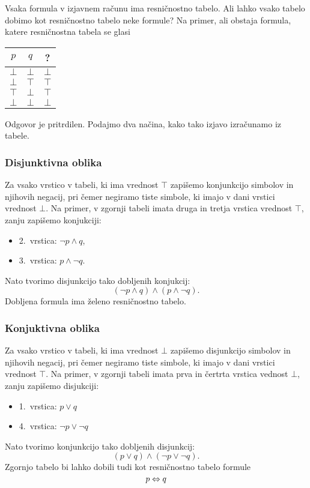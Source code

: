 Vsaka formula v izjavnem računu ima resničnostno tabelo. Ali lahko vsako tabelo
dobimo kot resničnostno tabelo neke formule? Na primer, ali obstaja formula,
katere resničnostna tabela se glasi
%
\begin{center}
  \begin{tabular}{ccc}
    \toprule
    $p$ & $q$ & ? \\ \midrule
    $\bot$ & $\bot$ & $\bot$ \\
    $\bot$ & $\top$ & $\top$ \\
    $\top$ & $\bot$ & $\top$ \\
    $\bot$ & $\bot$ & $\bot$ \\
    \bottomrule
  \end{tabular}
\end{center}
%
Odgovor je pritrdilen. Podajmo dva načina, kako tako izjavo izračunamo iz tabele.

\subsubsection{Disjunktivna oblika}
\label{sec:disjunktivna-oblika}

Za vsako vrstico v tabeli, ki ima vrednost $\top$ zapišemo konjunkcijo simbolov in
njihovih negacij, pri čemer negiramo tiste simbole, ki imajo v dani vrstici vrednost
$\bot$. Na primer, v zgornji tabeli imata druga in tretja vrstica vrednost $\top$, zanju
zapišemo konjukciji:
%
\begin{itemize}
\item 2.~vrstica: $\neg p \land q$,
\item 3.~vrstica: $p \land \neg q$.
\end{itemize}
%
Nato tvorimo disjunkcijo tako dobljenih konjukcij:
%
\begin{equation*}
  (\neg p \land q) \land (p \land \neg q).
\end{equation*}
%
Dobljena formula ima želeno resničnostno tabelo.

\subsubsection{Konjuktivna oblika}
\label{sec:konjuktivna-oblika}

Za vsako vrstico v tabeli, ki ima vrednost $\bot$ zapišemo
disjunkcijo simbolov in njihovih negacij, pri čemer negiramo tiste simbole, ki
imajo v dani vrstici vrednost $\top$. Na primer, v zgornji tabeli imata prva in
čertrta vrstica vednost $\bot$, zanju zapišemo disjukciji:
%
\begin{itemize}
\item 1.~vrstica: $p \lor q$
\item 4.~vrstica: $\neg p \lor \neg q$
\end{itemize}
%
Nato tvorimo konjunkcijo tako dobljenih disjunkcij:
%
\begin{equation*}
  (p \lor q) \land (\neg p \lor \neg q).
\end{equation*}
%
Zgornjo tabelo bi lahko dobili tudi kot resničnostno tabelo formule
%
\begin{equation*}
    p \Leftrightarrow q
\end{equation*}


